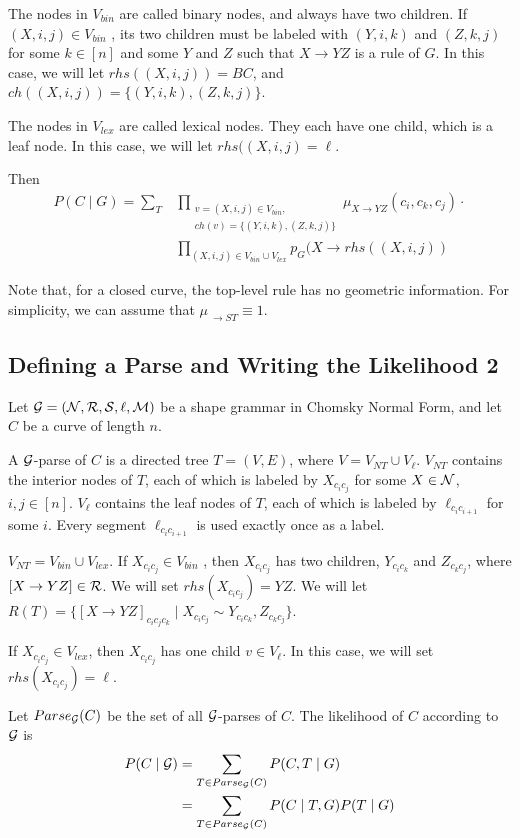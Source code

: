 \documentclass{article}
\begin{document}
The nodes in $V_{bin}$ are called binary nodes, and always
have two children. If $(X,i,j)\in V_{bin}$ , its two 
children must be labeled with $(Y,i,k)$ and $(Z,k,j)$
for some $k\in [n]$ and 
some $Y$ and $Z$ such that $X\to YZ$ is 
a rule of $G$. In this case, we
 will let $rhs( (X,i,j) ) = BC$, and $ch( (X,i,j) ) = \{(Y,i,k), (Z,k,j)\}$.

The nodes in $V_{lex}$ are called lexical nodes. They each
have one child, which is a leaf node.
In this case, we will let $rhs( (X,i,j) = \ell$.

Then 
\begin{align*}
P(C\mid G) = \sum_{T} &\prod_{\substack{v=(X,i,j) \in V_{bin}, \\ch(v)=\{(Y,i,k),(Z,k,j)\}}}
  \mu_{X\to YZ}(c_i, c_k, c_j) \cdot \\
&\prod_{(X,i,j) \in V_{bin} \cup V_{lex}} p_G(X \to rhs( (X,i,j) )
\end{align*}

Note that, for a closed curve, the top-level rule has no geometric
information. For simplicity, we can assume that $\mu_{\ \to ST} \equiv 1$.

\subsection{Defining a Parse and Writing the Likelihood 2}

Let ${\mathcal G} = ({\mathcal N},{\mathcal R},{\mathcal S},\ell,{\mathcal M})$ be a shape grammar in Chomsky
Normal Form, and let $C$ be a curve of length $n$.

A ${\mathcal G}$-parse of $C$ is a directed tree $T=(V,E)$, where $V=V_{NT}
\cup V_\ell$.  $V_{NT}$ contains the interior nodes of $T$, each of
which is labeled by $X_{c_i c_j}$ for some $X\in {\mathcal N}$, $i,j\in
[n]$. $V_\ell$ contains the leaf nodes of $T$, each of which is
labeled by $\ell_{c_i c_{i+1}}$ for some $i$. Every segment $\ell_{c_i
  c_{i+1}}$ is used exactly once as a label.

$V_{NT} = V_{bin} \cup V_{lex}$. If $X_{c_i c_j}\in V_{bin}$ , then
$X_{c_i c_j}$ has two children, $Y_{c_i c_k}$ and $Z_{c_k c_j}$, where
$[X\to YZ] \in {\mathcal R}$. We will set $rhs(X_{c_i c_j})=YZ$.  We will let
$R(T) = \{ [X\to YZ]_{c_i c_j c_k} \mid X_{c_i c_j} \sim Y_{c_i c_k},
Z_{c_k c_j}\}$.

If $X_{c_i c_j}\in V_{lex}$, then $X_{c_i c_j}$ has one child $v\in
V_\ell$. In this case, we will set $rhs(X_{c_i c_j})=\ell$.

Let $Parse_{{\mathcal G}}(C)$ be the set of all ${\mathcal G}$-parses of $C$.  The
likelihood of $C$ according to ${\mathcal G}$ is
\begin{align*}
P(C\mid{\mathcal G}) &= \sum_{T\in Parse_{{\mathcal G}}(C)} P(C,T\mid G)\\
&= \sum_{T\in Parse_{{\mathcal G}}(C)} P(C\mid T, G) P(T\mid G)\\
\end{align*}
\end{document}
